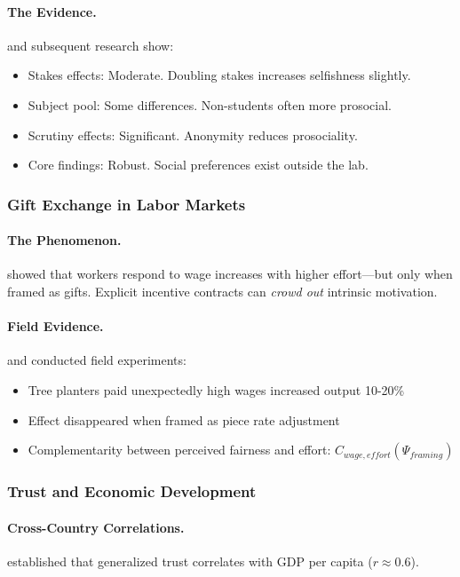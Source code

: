 \paragraph{The Evidence.}
\citet{levittlist2007interpretation} and subsequent research show:
\begin{itemize}
  \item Stakes effects: Moderate. Doubling stakes increases selfishness slightly.
  \item Subject pool: Some differences. Non-students often more prosocial.
  \item Scrutiny effects: Significant. Anonymity reduces prosociality.
  \item Core findings: Robust. Social preferences exist outside the lab.
\end{itemize}

\subsubsection{Gift Exchange in Labor Markets}

\paragraph{The Phenomenon.}
\citet{gneezyrustichini2000} showed that workers respond to wage increases
with higher effort---but only when framed as gifts.
Explicit incentive contracts can \emph{crowd out} intrinsic motivation.

\paragraph{Field Evidence.}
\citet{fehretal2009} and \citet{listmillimet2008} conducted field experiments:
\begin{itemize}
  \item Tree planters paid unexpectedly high wages increased output 10-20\%
  \item Effect disappeared when framed as piece rate adjustment
  \item Complementarity between perceived fairness and effort: $C_{wage,effort}(\Psi_{framing})$
\end{itemize}

\subsubsection{Trust and Economic Development}

\paragraph{Cross-Country Correlations.}
\citet{knackzak} established that generalized trust correlates with GDP per capita ($r \approx 0.6$).

